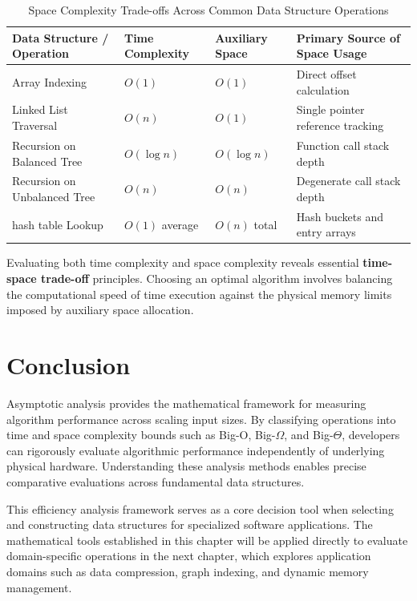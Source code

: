 \documentclass[12pt]{report}
\begin{document}
\begin{table}[htbp]
\centering
\caption{Space Complexity Trade-offs Across Common Data Structure Operations}
\label{tab:space_complexity}
\begin{tabularx}{\textwidth}{X >{\raggedright\arraybackslash}p{3cm} >{\raggedright\arraybackslash}p{3cm} X}
\toprule
\textbf{Data Structure / Operation} & \textbf{Time Complexity} & \textbf{Auxiliary Space} & \textbf{Primary Source of Space Usage} \\
\midrule
Array Indexing & $O(1)$ & $O(1)$ & Direct offset calculation \\
Linked List Traversal & $O(n)$ & $O(1)$ & Single pointer reference tracking \\
Recursion on Balanced Tree & $O(\log n)$ & $O(\log n)$ & Function call stack depth \\
Recursion on Unbalanced Tree & $O(n)$ & $O(n)$ & Degenerate call stack depth \\
hash table Lookup & $O(1)$ average & $O(n)$ total & Hash buckets and entry arrays \\
\bottomrule
\end{tabularx}
\end{table}

Evaluating both time complexity and space complexity reveals essential \textbf{time-space trade-off} principles. Choosing an optimal algorithm involves balancing the computational speed of time execution against the physical memory limits imposed by auxiliary space allocation.

\section{Conclusion}

Asymptotic analysis provides the mathematical framework for measuring algorithm performance across scaling input sizes. By classifying operations into time and space complexity bounds such as Big-O, Big-$\Omega$, and Big-$\Theta$, developers can rigorously evaluate algorithmic performance independently of underlying physical hardware. Understanding these analysis methods enables precise comparative evaluations across fundamental data structures.

This efficiency analysis framework serves as a core decision tool when selecting and constructing data structures for specialized software applications. The mathematical tools established in this chapter will be applied directly to evaluate domain-specific operations in the next chapter, which explores application domains such as data compression, graph indexing, and dynamic memory management.
\end{document}
